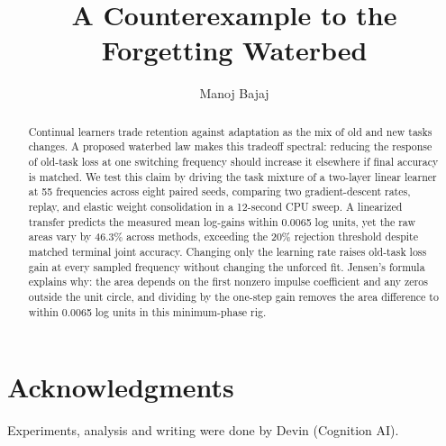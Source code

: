 \documentclass[11pt]{article}
\title{\textbf{A Counterexample to the Forgetting Waterbed}}
\author{Manoj Bajaj}
\date{}
\begin{document}
\maketitle

\begin{abstract}
Continual learners trade retention against adaptation as the mix of old and new tasks changes.
A proposed waterbed law makes this tradeoff spectral: reducing the response of old-task loss at one switching frequency should increase it elsewhere if final accuracy is matched.
We test this claim by driving the task mixture of a two-layer linear learner at 55 frequencies across eight paired seeds, comparing two gradient-descent rates, replay, and elastic weight consolidation in a 12-second CPU sweep.
A linearized transfer predicts the measured mean log-gains within 0.0065 log units, yet the raw areas vary by 46.3\% across methods, exceeding the 20\% rejection threshold despite matched terminal joint accuracy.
Changing only the learning rate raises old-task loss gain at every sampled frequency without changing the unforced fit.
Jensen's formula explains why: the area depends on the first nonzero impulse coefficient and any zeros outside the unit circle, and dividing by the one-step gain removes the area difference to within 0.0065 log units in this minimum-phase rig.
\end{abstract}





\section*{Acknowledgments}
Experiments, analysis and writing were done by Devin (Cognition AI).




\appendix

\end{document}
